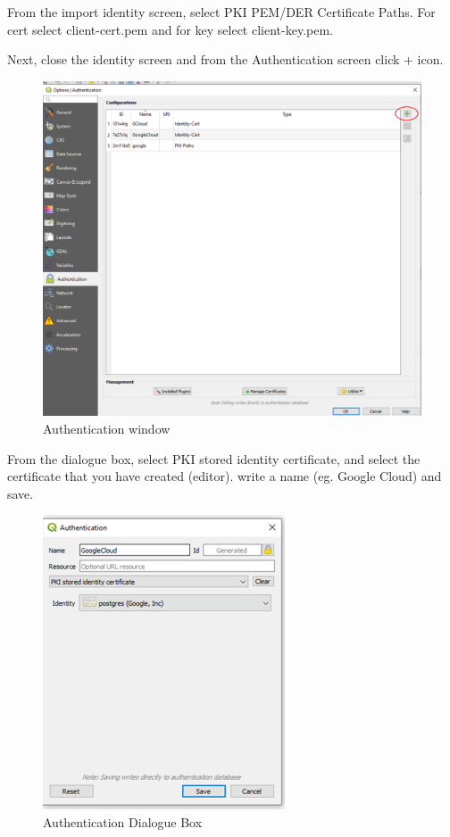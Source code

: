 \documentclass[
]{book}
\begin{document}
From the import identity screen, select PKI PEM/DER Certificate Paths. For cert select client-cert.pem and for key select client-key.pem.

Next, close the identity screen and from the Authentication screen click + icon.

\begin{figure}
\centering
\includegraphics{Images/authentication.png}
\caption{Authentication window}
\end{figure}

From the dialogue box, select PKI stored identity certificate, and select the certificate that you have created (editor). write a name (eg. Google Cloud) and save.

\begin{figure}
\centering
\includegraphics{Images/authentication2.png}
\caption{Authentication Dialogue Box}
\end{figure}
\end{document}
